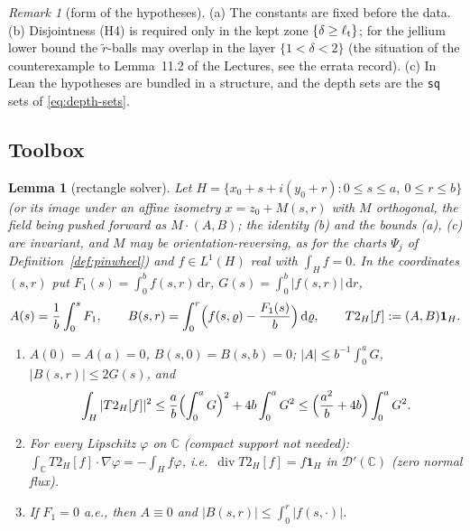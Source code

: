 \documentclass[11pt]{article}
\newtheorem{lemma}[theorem]{Lemma}
\theoremstyle{definition}
\theoremstyle{remark}
\newtheorem{remark}[theorem]{Remark}
\newcommand{\C}{\mathbb C}
\newcommand{\dd}{\,\mathrm d}
\newcommand{\dep}{\delta}
\newcommand{\lt}{\ell_{\rm t}}
\DeclareMathOperator{\Div}{div}
\begin{document}
\begin{remark}[form of the hypotheses]
(a) The constants are fixed before the data. (b) Disjointness (H4) is required only in the kept zone
$\{\dep\ge\lt\}$; for the jellium lower bound the $\tilde r$-balls may overlap in the layer $\{1<\dep<2\}$ (the situation of the counterexample to Lemma~11.2 of the Lectures, see the errata record). (c) In Lean the hypotheses
are bundled in a structure, and the depth sets are the \texttt{sq} sets of \eqref{eq:depth-sets}.
\end{remark}

\subsection{Toolbox}

\begin{lemma}[rectangle solver]\label{lem:T2}
Let $H=\{x_0+s+i(y_0+r):0\le s\le a,\ 0\le r\le b\}$ (or its image under an affine isometry $x=z_0+M(s,r)$ with $M$ orthogonal, the field being pushed forward as $M\cdot(A,B)$;
the identity (b) and the bounds (a), (c) are invariant, and $M$ may be orientation-reversing, as for the charts $\Psi_j$ of Definition~\ref{def:pinwheel}) and $f\in L^1(H)$ real with $\int_Hf=0$. In the coordinates $(s,r)$ put $F_1(s)=\int_0^bf(s,r)\dd r$, $G(s)=\int_0^b|f(s,r)|\dd r$,
\[
A(s)=\frac1b\int_0^sF_1,\qquad B(s,r)=\int_0^r\Bigl(f(s,\varrho)-\frac{F_1(s)}b\Bigr)\dd\varrho,\qquad T2_H[f]:=(A,B)\mathbf 1_H .
\]
\begin{enumerate}[label=(\alph*)]
\item $A(0)=A(a)=0$, $B(s,0)=B(s,b)=0$; $|A|\le b^{-1}\int_0^aG$, $|B(s,r)|\le2G(s)$, and
  \[
  \int_H|T2_H[f]|^2\le\frac ab\Bigl(\int_0^aG\Bigr)^2+4b\int_0^aG^2\le\Bigl(\frac{a^2}b+4b\Bigr)\int_0^aG^2 .
  \]
\item For every Lipschitz $\varphi$ on $\C$ (compact support not needed): $\int_\C T2_H[f]\cdot\nabla\varphi=-\int_Hf\varphi$, i.e.\
  $\Div T2_H[f]=f\mathbf 1_H$ in $\mathcal D'(\C)$ (zero normal flux).
\item If $F_1=0$ a.e., then $A\equiv0$ and $|B(s,r)|\le\int_0^r|f(s,\cdot)|$.
\end{enumerate}
\end{lemma}
\end{document}
